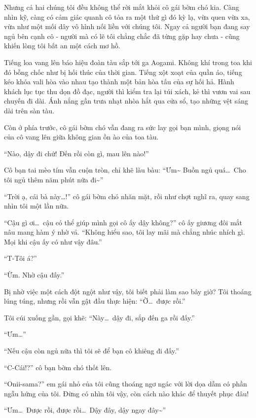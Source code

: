 \documentclass[../main.tex]{subfiles}
\begin{document}
Nhưng cả hai chúng tôi đều không thể rời mắt khỏi cô gái bờm chó kia. Càng nhìn kỹ, càng có cảm giác quanh cô tỏa ra một thứ gì đó kỳ lạ, vừa quen vừa xa, vừa như một mối dây vô hình nối liền với chúng tôi. Ngay cả người bạn đang say ngủ bên cạnh cô - người mà có lẽ tôi chẳng chắc đã từng gặp hay chưa - cũng khiến lòng tôi bất an một cách mơ hồ.

\ct

Tiếng loa vang lên báo hiệu đoàn tàu sắp tới ga Aogami. Không khí trong toa khi đó bỗng chốc như bị hối thúc của thời gian. Tiếng xột xoạt của quần áo, tiếng kéo khóa vali hòa vào nhau tạo thành một bản hòa tấu của sự hối hả. Hành khách lục tục thu dọn đồ đạc, người thì kiểm tra lại túi xách, kẻ thì vươn vai sau chuyến đi dài. Ánh nắng gần trưa nhạt nhòa hắt qua cửa sổ, tạo những vệt sáng dài trên sàn tàu.

Còn ở phía trước, cô gái bờm chó vẫn đang ra sức lay gọi bạn mình, giọng nói của cô vang lên giữa không gian ồn ào của toa tàu.

``Nào, dậy đi chứ! Đến rồi còn gì, mau lên nào!''

Cô bạn tai mèo tím vẫn cuộn tròn, chỉ khẽ làu bàu: ``Ưm\~{} Buồn ngủ quá\dots\ Cho tôi ngủ thêm năm phút nữa đi\~{}''

``Trời ạ, cái bà này\dots!'' cô gái bờm chó nhăn mặt, rồi như chợt nghĩ ra, quay sang nhìn tôi một lần nữa.

``Cậu gì ơi\dots\ cậu có thể giúp mình gọi cô ấy dậy không?'' cô ấy giương đôi mắt nâu mang hàm ý nhờ vả. ``Không hiểu sao, tôi lay mãi mà chẳng nhúc nhích gì. Mọi khi cậu ấy có như vậy đâu.''

``T-Tôi á?''

``Ừm. Nhờ cậu đấy.''

Bị nhờ việc một cách đột ngột như vậy, tôi biết phải làm sao bây giờ? Tôi thoáng lúng túng, nhưng rồi vẫn gật đầu thực hiện: ``Ờ\dots\ được rồi.''

Tôi cúi xuống gần, gọi khẽ: ``Này\dots\ dậy đi, sắp đến ga rồi đấy.''

``Ưm\dots''

``Nếu cậu còn ngủ nữa thì tôi sẽ để bạn cô khiêng đi đấy.''

``C-Cái!?'' cô bạn bờm chó thốt lên.

``Onii-sama?'' em gái nhỏ của tôi cũng thoáng ngơ ngác với lời dọa dẫm có phần ngẫu hứng của tôi. Đừng có nhìn tôi vậy, còn cách nào khác để thuyết phục đâu!

``Ưm\dots\ Được rồi, được rồi\dots\ Dậy đây, dậy ngay đây\~{}''
\end{document}
